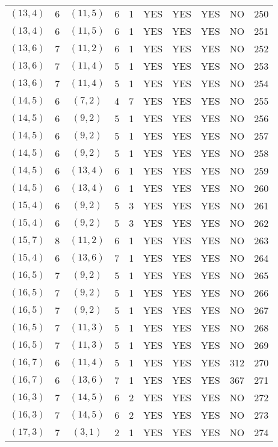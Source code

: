 \begin{longtable}{|c|c|c|c|c|c|c|c|c|c|}
$(13, 4)$ & 6 & $(11, 5)$ & 6 & 1 & YES & YES & YES & NO & 250\\
$(13, 4)$ & 6 & $(11, 5)$ & 6 & 1 & YES & YES & YES & NO & 251\\
$(13, 6)$ & 7 & $(11, 2)$ & 6 & 1 & YES & YES & YES & NO & 252\\
$(13, 6)$ & 7 & $(11, 4)$ & 5 & 1 & YES & YES & YES & NO & 253\\
$(13, 6)$ & 7 & $(11, 4)$ & 5 & 1 & YES & YES & YES & NO & 254\\
$(14, 5)$ & 6 & $(7, 2)$ & 4 & 7 & YES & YES & YES & NO & 255\\
$(14, 5)$ & 6 & $(9, 2)$ & 5 & 1 & YES & YES & YES & NO & 256\\
$(14, 5)$ & 6 & $(9, 2)$ & 5 & 1 & YES & YES & YES & NO & 257\\
$(14, 5)$ & 6 & $(9, 2)$ & 5 & 1 & YES & YES & YES & NO & 258\\
$(14, 5)$ & 6 & $(13, 4)$ & 6 & 1 & YES & YES & YES & NO & 259\\
$(14, 5)$ & 6 & $(13, 4)$ & 6 & 1 & YES & YES & YES & NO & 260\\
$(15, 4)$ & 6 & $(9, 2)$ & 5 & 3 & YES & YES & YES & NO & 261\\
$(15, 4)$ & 6 & $(9, 2)$ & 5 & 3 & YES & YES & YES & NO & 262\\
$(15, 7)$ & 8 & $(11, 2)$ & 6 & 1 & YES & YES & YES & NO & 263\\
$(15, 4)$ & 6 & $(13, 6)$ & 7 & 1 & YES & YES & YES & NO & 264\\
$(16, 5)$ & 7 & $(9, 2)$ & 5 & 1 & YES & YES & YES & NO & 265\\
$(16, 5)$ & 7 & $(9, 2)$ & 5 & 1 & YES & YES & YES & NO & 266\\
$(16, 5)$ & 7 & $(9, 2)$ & 5 & 1 & YES & YES & YES & NO & 267\\
$(16, 5)$ & 7 & $(11, 3)$ & 5 & 1 & YES & YES & YES & NO & 268\\
$(16, 5)$ & 7 & $(11, 3)$ & 5 & 1 & YES & YES & YES & NO & 269\\
$(16, 7)$ & 6 & $(11, 4)$ & 5 & 1 & YES & YES & YES & 312 & 270\\
$(16, 7)$ & 6 & $(13, 6)$ & 7 & 1 & YES & YES & YES & 367 & 271\\
$(16, 3)$ & 7 & $(14, 5)$ & 6 & 2 & YES & YES & YES & NO & 272\\
$(16, 3)$ & 7 & $(14, 5)$ & 6 & 2 & YES & YES & YES & NO & 273\\
$(17, 3)$ & 7 & $(3, 1)$ & 2 & 1 & YES & YES & YES & NO & 274\\

\end{longtable}
